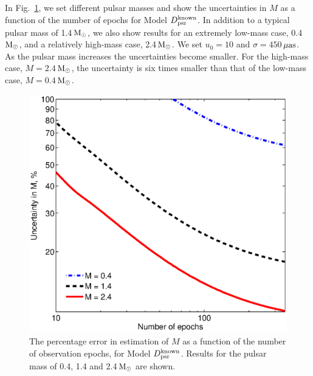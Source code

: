 \documentclass[iop,apj]{emulateapj}
\begin{document}
In Fig.~\ref{masses}, we set different pulsar masses and show the uncertainties in 
$M$ as a function of the number of epochs for Model $D_{\rm{psr}}^{\rm{known}}$. In addition to a typical pulsar 
mass of 1.4\,$\rm{M_{\odot}}$, we also show results for an extremely low-mass case, 0.4\,$\rm{M_{\odot}}$, 
and a relatively high-mass case, 2.4\,$\rm{M_{\odot}}$. We set $u_0=10$ and 
$\sigma=450$\,$\rm{\mu as}$. 
%
As the pulsar mass increases the uncertainties become smaller. For 
the high-mass case, $M=2.4$\,$\rm{M_{\odot}}$, the uncertainty is six times smaller 
than that of the low-mass case, $M=0.4$\,$\rm{M_{\odot}}$.
%
%
\begin{figure}
\begin{center}
  \includegraphics[width=3.5 in]{masses.eps}
%
\caption{The percentage error in estimation of $M$ as a function of the number of observation epochs,
for Model $D_{\rm{psr}}^{\rm{known}}$. Results for the pulsar mass of 0.4, 1.4 and 2.4\,$\rm{M_{\odot}}$ are shown.
}
\label{masses}
\end{center}
\end{figure}
%
%
\end{document}

